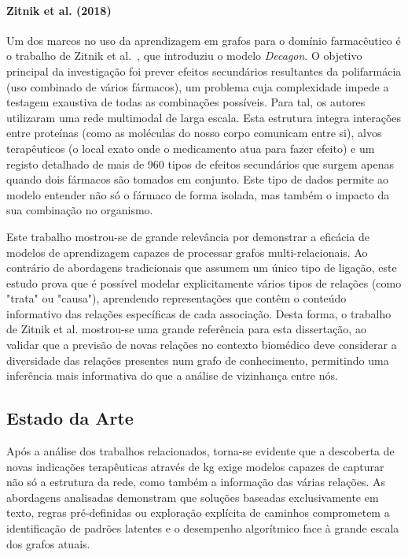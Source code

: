 \paragraph{Zitnik et al. (2018)}
Um dos marcos no uso da aprendizagem em grafos para o domínio farmacêutico é o trabalho de Zitnik et al.~\cite{zitnik2018}, que introduziu o modelo \emph{Decagon}. O objetivo principal da investigação foi prever efeitos secundários resultantes da polifarmácia (uso combinado de vários fármacos), um problema cuja complexidade impede a testagem exaustiva de todas as combinações possíveis. Para tal, os autores utilizaram uma rede multimodal de larga escala. Esta estrutura integra interações entre proteínas (como as moléculas do nosso corpo comunicam entre si), alvos terapêuticos (o local exato onde o medicamento atua para fazer efeito) e um registo detalhado de mais de 960 tipos de efeitos secundários que surgem apenas quando dois fármacos são tomados em conjunto. Este tipo de dados permite ao modelo entender não só o fármaco de forma isolada, mas também o impacto da sua combinação no organismo.

Este trabalho mostrou-se de grande relevância por demonstrar a eficácia de modelos de aprendizagem capazes de processar grafos multi-relacionais. Ao contrário de abordagens tradicionais que assumem um único tipo de ligação, este estudo prova que é possível modelar explicitamente vários tipos de relações (como "trata" ou "causa"), aprendendo representações que contêm o conteúdo informativo das relações específicas de cada associação. Desta forma, o trabalho de Zitnik et al. mostrou-se uma grande referência para esta dissertação, ao validar que a previsão de novas relações no contexto biomédico deve considerar a diversidade das relações presentes num grafo de conhecimento, permitindo uma inferência mais informativa do que a análise de vizinhança entre nós.

\subsection{Estado da Arte}
\label{sec:State of Art}
Após a análise dos trabalhos relacionados, torna-se evidente que a descoberta de novas indicações terapêuticas através de \acrshort{kg} exige modelos capazes de capturar não só a estrutura da rede, como também a informação das várias relações. As abordagens analisadas demonstram que soluções baseadas exclusivamente em texto, regras pré-definidas ou exploração explícita de caminhos comprometem a identificação de padrões latentes e o desempenho algorítmico face à grande escala dos grafos atuais.

